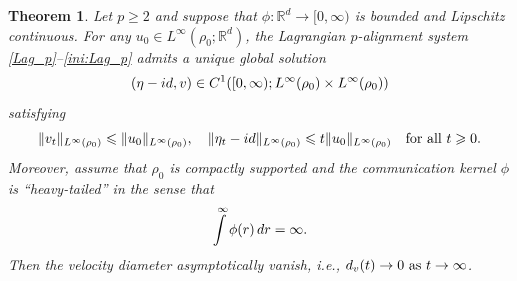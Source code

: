 \documentclass[10pt,a4paper]{amsart}
\newtheorem{theorem}{Theorem}
\newcommand{\R}{\mathbb R}
\newcommand{\bq}{\begin{equation}}
\newcommand{\dr}{\textnormal{d}r}
\newcommand{\eq}{\end{equation}}
\renewcommand{\ge}{\geqslant}
\renewcommand{\le}{\leqslant}
\newcommand{\rd}{\textnormal{d}}
\begin{document}
 \begin{theorem}\label{thm:ext} Let  $p\ge2$ and suppose that $\phi:\R^d\to[0,\infty)$ is bounded and Lipschitz continuous. 
For any $u_0\in  L^\infty(\rho_0; \R^d)$, the Lagrangian $p$-alignment system \eqref{Lag_p}--\eqref{ini:Lag_p} admits a unique global solution
\bq\label{reg_Lag}
(\eta - {\rm id},v)\in C^1([0,\infty);L^\infty(\rho_0)\times  L^\infty(\rho_0))
\eq
satisfying
\[
\|v_t\|_{L^\infty(\rho_0)} \le \|u_0\|_{L^\infty(\rho_0)},  \quad  \|\eta_t-{\rm id}\|_{L^\infty(\rho_0)} \le t \|u_0\|_{L^\infty(\rho_0)} \quad\text{for all }t\ge0.
\]
 Moreover, assume that $\rho_0$ is compactly supported and the communication kernel $\phi$ is ``heavy-tailed'' in the sense that
\bq\label{condi_phi}
\int \limits^\infty \phi(r)\,\dr = \infty.
\eq
Then the velocity diameter asymptotically vanish, i.e.,
$\rd_v(t) \to 0 \  \text{as } t \to \infty$.
 \end{theorem}
\end{document}
